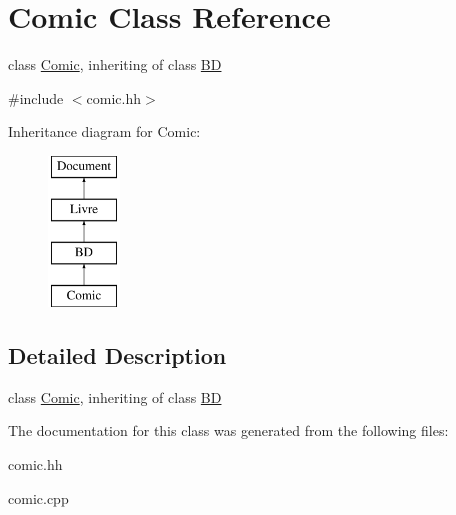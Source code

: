 \hypertarget{classComic}{
\section{Comic Class Reference}
\label{classComic}
}


class \hyperlink{classComic}{Comic}, inheriting of class \hyperlink{classBD}{BD}  




{\ttfamily \#include $<$comic.hh$>$}

Inheritance diagram for Comic:\begin{figure}[H]
\begin{center}
\leavevmode
\includegraphics[height=4.000000cm]{classComic}
\end{center}
\end{figure}


\subsection{Detailed Description}
class \hyperlink{classComic}{Comic}, inheriting of class \hyperlink{classBD}{BD} 

The documentation for this class was generated from the following files:\begin{DoxyCompactItemize}
\item 
comic.hh\item 
comic.cpp\end{DoxyCompactItemize}
